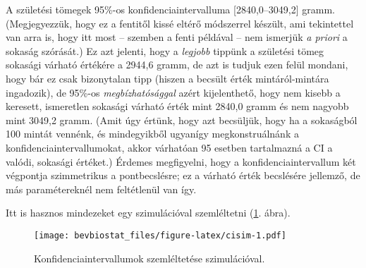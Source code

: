 \documentclass[]{book}
\newenvironment{Shaded}{\begin{snugshade}}{\end{snugshade}}
\newcommand{\KeywordTok}[1]{\textcolor[rgb]{0.13,0.29,0.53}{\textbf{#1}}}
\newcommand{\DataTypeTok}[1]{\textcolor[rgb]{0.13,0.29,0.53}{#1}}
\newcommand{\DecValTok}[1]{\textcolor[rgb]{0.00,0.00,0.81}{#1}}
\newcommand{\StringTok}[1]{\textcolor[rgb]{0.31,0.60,0.02}{#1}}
\newcommand{\OtherTok}[1]{\textcolor[rgb]{0.56,0.35,0.01}{#1}}
\newcommand{\OperatorTok}[1]{\textcolor[rgb]{0.81,0.36,0.00}{\textbf{#1}}}
\newcommand{\NormalTok}[1]{#1}
\begin{document}
A születési tömegek 95\%-os konfidenciaintervalluma {[}2840,0--3049,2{]}
gramm. (Megjegyezzük, hogy ez a fentitől kissé eltérő módszerrel
készült, ami tekintettel van arra is, hogy itt most -- szemben a fenti
példával -- nem ismerjük \emph{a priori} a sokaság szórását.) Ez azt
jelenti, hogy a \emph{legjobb} tippünk a születési tömeg sokasági
várható értékére a 2944,6 gramm, de azt is tudjuk ezen felül mondani,
hogy bár ez csak bizonytalan tipp (hiszen a becsült érték
mintáról-mintára ingadozik), de 95\%-os \emph{megbízhatósággal} azért
kijelenthető, hogy nem kisebb a keresett, ismeretlen sokasági várható
érték mint 2840,0 gramm és nem nagyobb mint 3049,2 gramm. (Amit úgy
értünk, hogy azt becsüljük, hogy ha a sokaságból 100 mintát vennénk, és
mindegyikből ugyanígy megkonstruálnánk a konfidenciaintervallumokat,
akkor várhatóan 95 esetben tartalmazná a CI a valódi, sokasági értéket.)
Érdemes megfigyelni, hogy a konfidenciaintervallum két végpontja
szimmetrikus a pontbecslésre; ez a várható érték becslésére jellemző, de
más paramétereknél nem feltétlenül van így.

Itt is hasznos mindezeket egy szimulációval szemléltetni
(\ref{fig:cisim}. ábra).

\begin{Shaded}
\end{Shaded}

\begin{figure}
\centering
\texttt{[image: bevbiostat\_files/figure-latex/cisim-1.pdf]}
\caption{\label{fig:cisim}Konfidenciaintervallumok szemléltetése
szimulációval.}
\end{figure}
\end{document}
